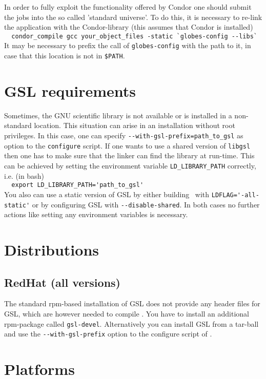 In order to fully exploit the functionality offered by Condor one
should submit the jobs into the so called 'standard universe'. To do
this, it is necessary to re-link the application with the
Condor-library (this assumes that Condor is installed)\\ 
\verb+  condor_compile gcc your_object_files -static `globes-config --libs`+\\
It may be necessary to prefix the call of \verb+globes-config+ with
the path to it, in case that this location is not in \verb+$PATH+.

\section*{GSL requirements}

Sometimes, the GNU scientific library is not available or is installed
in a non-standard location. This situation can arise in an
installation without root privileges. In this case, one can specify
\verb+--with-gsl-prefix=path_to_gsl+ as option to the \verb+configure+ script.
If one wants to use a shared version of \verb+libgsl+ then one has to make
sure that the linker can find the library at run-time. This can be
achieved by setting the environment variable \verb+LD_LIBRARY_PATH+
correctly, i.e. (in bash)\\
\verb+  export LD_LIBRARY_PATH='path_to_gsl'+\\
You also can use a static version of GSL by either building \GLOBES\
with \verb+LDFLAG='-all-static'+ or by configuring GSL with
\verb+--disable-shared+. In both cases no further actions like setting any
environment variables is necessary.

\section*{Distributions}


\subsection*{RedHat (all versions)}

The standard rpm-based installation of GSL does not provide any header
files for GSL, which are however needed to compile \GLOBES. You have to
install an additional rpm-package called \verb+gsl-devel+. Alternatively
you can install GSL from a tar-ball and use the \verb+--with-gsl-prefix+
option to the configure script of \GLOBES.

\section*{Platforms}


